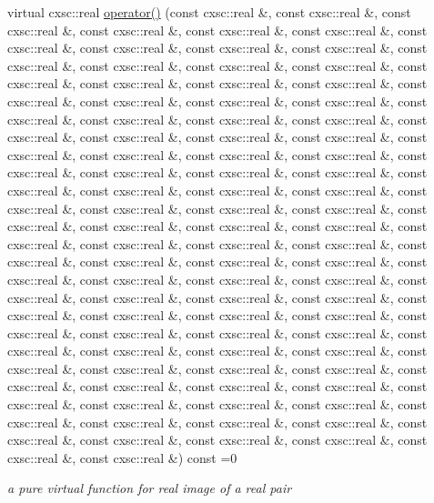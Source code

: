 \begin{DoxyCompactItemize}
virtual cxsc\-::real \hyperlink{classsubpavings_1_1MappedFobj100D_a6623df51bcbb3ed9ddb9d7e7e38b96eb}{operator()} (const cxsc\-::real \&, const cxsc\-::real \&, const cxsc\-::real \&, const cxsc\-::real \&, const cxsc\-::real \&, const cxsc\-::real \&, const cxsc\-::real \&, const cxsc\-::real \&, const cxsc\-::real \&, const cxsc\-::real \&, const cxsc\-::real \&, const cxsc\-::real \&, const cxsc\-::real \&, const cxsc\-::real \&, const cxsc\-::real \&, const cxsc\-::real \&, const cxsc\-::real \&, const cxsc\-::real \&, const cxsc\-::real \&, const cxsc\-::real \&, const cxsc\-::real \&, const cxsc\-::real \&, const cxsc\-::real \&, const cxsc\-::real \&, const cxsc\-::real \&, const cxsc\-::real \&, const cxsc\-::real \&, const cxsc\-::real \&, const cxsc\-::real \&, const cxsc\-::real \&, const cxsc\-::real \&, const cxsc\-::real \&, const cxsc\-::real \&, const cxsc\-::real \&, const cxsc\-::real \&, const cxsc\-::real \&, const cxsc\-::real \&, const cxsc\-::real \&, const cxsc\-::real \&, const cxsc\-::real \&, const cxsc\-::real \&, const cxsc\-::real \&, const cxsc\-::real \&, const cxsc\-::real \&, const cxsc\-::real \&, const cxsc\-::real \&, const cxsc\-::real \&, const cxsc\-::real \&, const cxsc\-::real \&, const cxsc\-::real \&, const cxsc\-::real \&, const cxsc\-::real \&, const cxsc\-::real \&, const cxsc\-::real \&, const cxsc\-::real \&, const cxsc\-::real \&, const cxsc\-::real \&, const cxsc\-::real \&, const cxsc\-::real \&, const cxsc\-::real \&, const cxsc\-::real \&, const cxsc\-::real \&, const cxsc\-::real \&, const cxsc\-::real \&, const cxsc\-::real \&, const cxsc\-::real \&, const cxsc\-::real \&, const cxsc\-::real \&, const cxsc\-::real \&, const cxsc\-::real \&, const cxsc\-::real \&, const cxsc\-::real \&, const cxsc\-::real \&, const cxsc\-::real \&, const cxsc\-::real \&, const cxsc\-::real \&, const cxsc\-::real \&, const cxsc\-::real \&, const cxsc\-::real \&, const cxsc\-::real \&, const cxsc\-::real \&, const cxsc\-::real \&, const cxsc\-::real \&, const cxsc\-::real \&, const cxsc\-::real \&, const cxsc\-::real \&, const cxsc\-::real \&, const cxsc\-::real \&, const cxsc\-::real \&, const cxsc\-::real \&, const cxsc\-::real \&, const cxsc\-::real \&, const cxsc\-::real \&, const cxsc\-::real \&, const cxsc\-::real \&, const cxsc\-::real \&, const cxsc\-::real \&, const cxsc\-::real \&, const cxsc\-::real \&, const cxsc\-::real \&) const =0
\begin{DoxyCompactList}\small\item\em a pure virtual function for real image of a real pair \end{DoxyCompactList}\item 

\end{DoxyCompactItemize}
